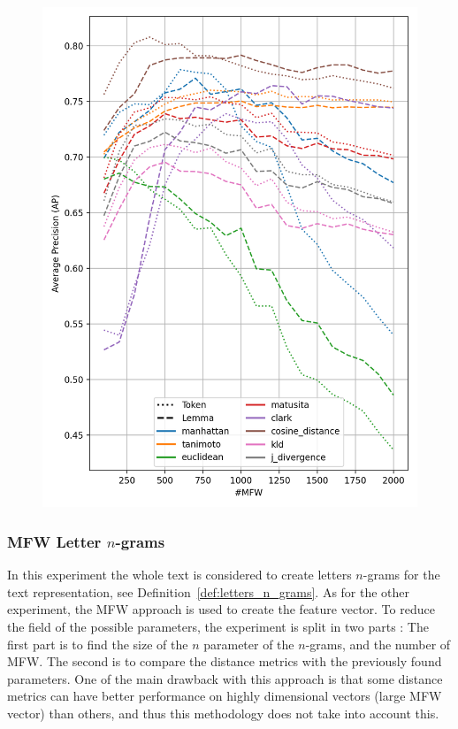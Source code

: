 \begin{figure}
  \label{fig:token_vs_lemma_st_jean}
  \includegraphics[width=0.9\linewidth]{img/token_vs_lemma_st_jean.png}
\end{figure}

\subsubsection{MFW Letter $n$-grams}

In this experiment the whole text is considered to create letters $n$-grams for the text representation, see Definition~\ref{def:letters_n_grams}.
As for the other experiment, the MFW approach is used to create the feature vector.
To reduce the field of the possible parameters, the experiment is split in two parts :
The first part is to find the size of the $n$ parameter of the $n$-grams, and the number of MFW.
The second is to compare the distance metrics with the previously found parameters.
One of the main drawback with this approach is that some distance metrics can have better performance on highly dimensional vectors (large MFW vector) than others, and thus this methodology does not take into account this.

